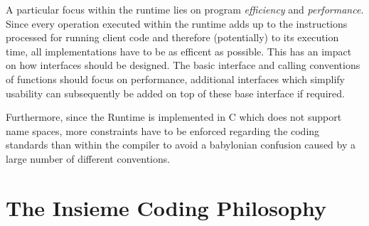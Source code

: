 A particular focus within the runtime lies on program \textit{efficiency} and
\textit{performance}. Since every operation executed within the runtime adds up
to the instructions processed for running client code and therefore
(potentially) to its execution time, all implementations have to be as efficent
as possible. This has an impact on how interfaces should be designed. The basic interface and calling conventions of functions should focus on performance, additional interfaces which simplify usability can subsequently be added on top of these base interface if required.

Furthermore, since the Runtime is implemented in C which does not support name
spaces, more constraints have to be enforced regarding the coding standards than
within the compiler to avoid a babylonian confusion caused by a large number of
different conventions.

\section{The Insieme Coding Philosophy}

